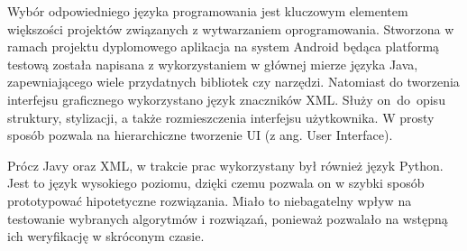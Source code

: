 Wybór odpowiedniego języka programowania jest kluczowym elementem większości projektów związanych z wytwarzaniem oprogramowania. Stworzona w ramach projektu dyplomowego aplikacja na system Android będąca platformą testową została napisana z wykorzystaniem w głównej mierze języka Java, zapewniającego wiele przydatnych bibliotek czy narzędzi. Natomiast do tworzenia interfejsu graficznego wykorzystano język znaczników XML. Służy on~do~opisu struktury, stylizacji, a także rozmieszczenia interfejsu użytkownika. W prosty sposób pozwala na hierarchiczne tworzenie UI (z ang. User Interface). 

\par

Prócz Javy oraz XML, w trakcie prac wykorzystany był również język Python. Jest to język wysokiego poziomu, dzięki czemu pozwala on w szybki sposób prototypować hipotetyczne rozwiązania. Miało to niebagatelny wpływ na testowanie wybranych algorytmów i rozwiązań, ponieważ pozwalało na wstępną ich weryfikację w skróconym czasie. 